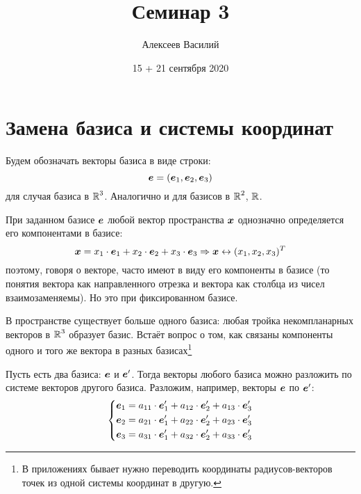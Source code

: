 \documentclass[a4paper,12pt]{article}
\author{Алексеев Василий}
\title{Семинар 3}
\date{15 + 21 сентября 2020}
\begin{document}
  \maketitle
  
  \tableofcontents

  \thispagestyle{empty}
  
  \newpage
  


  \section{Замена базиса и системы координат}
  
  Будем обозначать векторы базиса в виде строки:
  \[
    \bds e \hm= (\bds e_1, \bds e_2, \bds e_3)
  \]
  для случая базиса в $\operatorname{\mathbb R}^3$.
  Аналогично и для базисов в $\operatorname{\mathbb R}^2$, $\operatorname{\mathbb R}$.
  
  При заданном базисе $\boldsymbol e$ любой вектор пространства $\boldsymbol x$ однозначно определяется его компонентами в базисе:
  \[
    \boldsymbol x = x_1 \cdot \boldsymbol e_1 + x_2 \cdot \boldsymbol e_2 + x_3 \cdot \boldsymbol e_3
      \Rightarrow \boldsymbol x \leftrightarrow (x_1, x_2, x_3)^T
  \]
  поэтому, говоря о векторе, часто имеют в виду его компоненты в базисе (то понятия вектора как направленного отрезка и вектора как столбца из чисел взаимозаменяемы).
  Но это при фиксированном базисе.
  
  В пространстве существует больше одного базиса: любая тройка некомпланарных векторов в $\operatorname{\mathbb R}^3$ образует базис.
  Встаёт вопрос о том, как связаны компоненты одного и того же вектора в разных базисах\footnote{В приложениях бывает нужно переводить координаты радиусов-векторов точек из одной системы координат в другую.}
  
  Пусть есть два базиса: $\boldsymbol e$ и $\boldsymbol e'$.  %
  Тогда векторы любого базиса можно разложить по системе векторов другого базиса.
  Разложим, например, векторы $\boldsymbol e$ по $\boldsymbol e'$:
  \begin{equation}\label{eq:e1-to-e2-via-system-of-equations}
    \left\{
      \begin{aligned}
        &\boldsymbol e_1 = a_{11} \cdot \boldsymbol e'_1 + a_{12} \cdot \boldsymbol e'_2 + a_{13} \cdot \boldsymbol e'_3\\
        &\boldsymbol e_2 = a_{21} \cdot \boldsymbol e'_1 + a_{22} \cdot \boldsymbol e'_2 + a_{23} \cdot \boldsymbol e'_3\\
        &\boldsymbol e_3 = a_{31} \cdot \boldsymbol e'_1 + a_{32} \cdot \boldsymbol e'_2 + a_{33} \cdot \boldsymbol e'_3
      \end{aligned}
    \right.
  \end{equation}
  
\end{document}
